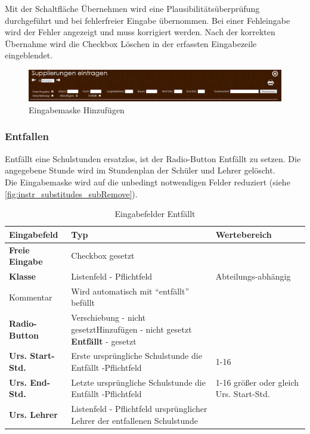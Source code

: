 Mit der Schaltfläche Übernehmen wird eine Plausibilitätsüberprüfung durchgeführt und bei fehlerfreier Eingabe übernommen. Bei einer Fehleingabe wird der Fehler angezeigt und muss korrigiert werden. Nach der korrekten Übernahme wird die Checkbox Löschen in der erfassten Eingabezeile eingeblendet.
\begin{figure}[H]
\centering
\includegraphics[keepaspectratio=true, width=14cm]{images/screenshots/substitudes_add.png}
\caption{Eingabemaske Hinzufügen}
\label{fig:instr_substitudes_subAdd}
\end{figure}
\subsubsection{Entfallen}\label{sec:instr_admin_sub_remove}
Entfällt eine Schulstunden ersatzlos, ist der Radio-Button Entfällt zu setzen. Die angegebene Stunde wird im Stundenplan der Schüler und Lehrer gelöscht.\\
Die Eingabemaske wird auf die unbedingt notwendigen Felder reduziert (siehe \autoref{fig:instr_substitudes_subRemove}).
\begin{table}[H]
\centering
\begin{tabular}{p{3 cm}p{6 cm}p{5 cm}}
   \toprule
   \textbf{Eingabefeld} & \textbf{Typ} & \textbf{Wertebereich} \\
   \midrule
          \textbf{Freie Eingabe} & Checkbox \newline gesetzt & \\
          \hline
          \textbf{Klasse} & Listenfeld - Pflichtfeld & Abteilungs-abhängig \\
          \hline
          Kommentar & Wird automatisch mit \enquote{entfällt} befüllt & \\
          \hline
          \textbf{Radio-Button} & Verschiebung - nicht gesetzt\newline Hinzufügen - nicht gesetzt \newline \textbf{Entfällt} - gesetzt & \\
          \hline
          \textbf{Urs. Start-Std.} & Erste ursprüngliche Schulstunde die Entfällt  -Pflichtfeld & 1-16 \\
          \hline
          \textbf{Urs. End-Std.} & Letzte ursprüngliche Schulstunde die Entfällt  -Pflichtfeld & 1-16 \newline größer oder gleich Urs. Start-Std.\\
          \hline
          \textbf{Urs. Lehrer} & Listenfeld - Pflichtfeld \newline ursprünglicher Lehrer der entfallenen Schulstunde\\
   \bottomrule
\end{tabular}
\caption{Eingabefelder Entfällt}
\end{table}
